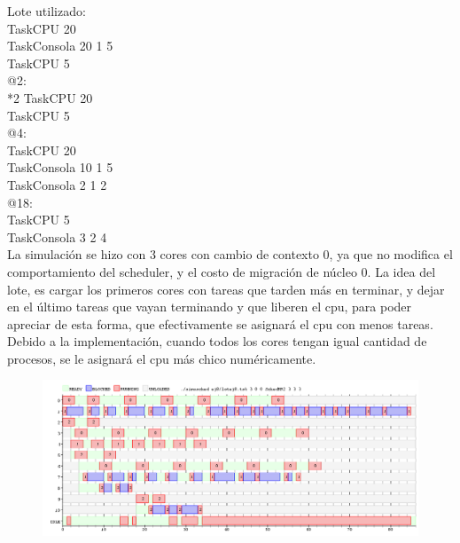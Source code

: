 Lote utilizado:\\

\noindent TaskCPU 20		\\
TaskConsola 20 1 5	\\
TaskCPU 5\\
@2: \\
*2 TaskCPU 20\\
TaskCPU 5\\
@4:\\
TaskCPU 20\\
TaskConsola 10 1 5\\
TaskConsola 2 1 2\\
@18:	\\			
TaskCPU 5\\
TaskConsola 3 2 4\\

La simulación se hizo con 3 cores con cambio de contexto 0, ya que no modifica el comportamiento del scheduler, y el costo de migración de núcleo 0.
La idea del lote, es cargar los primeros cores con tareas que tarden más en terminar, y dejar en el último tareas que vayan terminando y que liberen el cpu, para poder apreciar de esta forma, que efectivamente se asignará el cpu con menos tareas.
Debido a la implementación, cuando todos los cores tengan igual cantidad de procesos, se le asignará el cpu más chico numéricamente. 

\newpage

\begin{figure}[h]
  \includegraphics[width=\textwidth]{../ej8/rr2.png}
  \caption{}
\end{figure}

